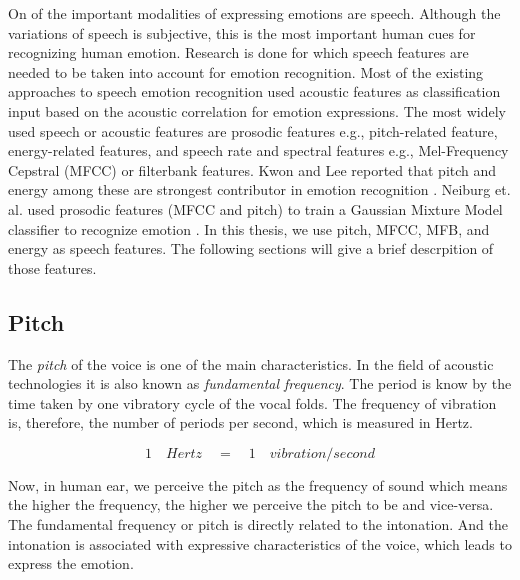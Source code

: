 On of the important modalities of expressing emotions are speech. Although the variations of speech is subjective, this is the most important human cues for recognizing human emotion. Research is done for which speech features are needed to be taken into account for emotion recognition. Most of the existing approaches to speech emotion recognition used acoustic features as classification input based on the acoustic correlation for emotion expressions. The most widely used speech or acoustic features are prosodic features e.g., pitch-related feature, energy-related features, and speech rate and spectral features e.g., Mel-Frequency Cepstral (MFCC) or filterbank features. Kwon and Lee reported that pitch and energy among these are strongest contributor in emotion recognition \cite{Kwon2003EmotionRB}. Neiburg et. al. used prosodic features (MFCC and pitch) to train a Gaussian Mixture Model classifier to recognize emotion \cite{Neiberg2006EmotionRI}. In this thesis, we use pitch, MFCC, MFB, and energy as speech features. The following sections will give a brief descrpition of those features. 

\subsection{Pitch}

The \textit{pitch} of the voice is one of the main characteristics. In the field of acoustic technologies it is also known as  \textit{fundamental frequency}. The period is know by the time taken by one vibratory cycle of the vocal folds. The frequency of vibration is, therefore, the number of periods per second, which is measured in Hertz.

\begin{equation}
    1\quad  Hertz\quad = \quad1\quad  vibration/second
\end{equation}

Now, in human ear, we perceive the pitch as the frequency of sound which means the higher the frequency, the higher we perceive the pitch to be and vice-versa. The fundamental frequency or pitch is directly related to the intonation. And the intonation is associated with expressive characteristics of the voice, which leads to express the emotion. 

